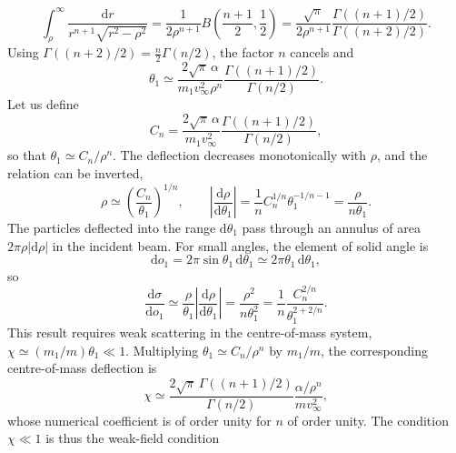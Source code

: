 \begin{problem}[title={Small-angle cross-section in a field \texorplain{$\alpha/r^n$}{α/rⁿ}}]
{\begin{equation*}
    \int_\rho^\infty \frac{\mathrm{d}r}{r^{n+1}\sqrt{r^2 - \rho^2}} = \frac{1}{2\rho^{n+1}}B\left( \frac{n+1}{2}, \frac{1}{2} \right) = \frac{\sqrt{\pi}}{2\rho^{n+1}}\frac{\Gamma\left( (n+1)/2 \right)}{\Gamma\left( (n+2)/2 \right)}.
\end{equation*}
Using $\Gamma\left( (n+2)/2 \right) = \frac{n}{2}\Gamma(n/2)$, the factor $n$ cancels and
\begin{equation*}
    \theta_1 \simeq \frac{2\sqrt{\pi}\,\alpha}{m_1v_\infty^2\rho^n}\frac{\Gamma\left( (n+1)/2 \right)}{\Gamma(n/2)}.
\end{equation*}
Let us define
\begin{equation*}
    C_n = \frac{2\sqrt{\pi}\,\alpha}{m_1v_\infty^2}\frac{\Gamma\left( (n+1)/2 \right)}{\Gamma(n/2)},
\end{equation*}
so that $\theta_1 \simeq C_n/\rho^n$. The deflection decreases monotonically with $\rho$, and the relation can be inverted,
\begin{equation*}
    \rho \simeq \left( \frac{C_n}{\theta_1} \right)^{1/n}, \qquad \left| \frac{\mathrm{d}\rho}{\mathrm{d}\theta_1} \right| = \frac{1}{n}C_n^{1/n}\theta_1^{-1/n-1} = \frac{\rho}{n\theta_1}.
\end{equation*}
The particles deflected into the range $\mathrm{d}\theta_1$ pass through an annulus of area $2\pi\rho|\mathrm{d}\rho|$ in the incident beam. For small angles, the element of solid angle is
\begin{equation*}
    \mathrm{d}o_1 = 2\pi\sin{\theta_1}\,\mathrm{d}\theta_1 \simeq 2\pi\theta_1\,\mathrm{d}\theta_1,
\end{equation*}
so
\begin{equation*}
    \frac{\mathrm{d}\sigma}{\mathrm{d}o_1} \simeq \frac{\rho}{\theta_1}\left| \frac{\mathrm{d}\rho}{\mathrm{d}\theta_1} \right| = \frac{\rho^2}{n\theta_1^2} = \frac{1}{n}\frac{C_n^{2/n}}{\theta_1^{2+2/n}}.
\end{equation*}
This result requires weak scattering in the centre-of-mass system, $\chi \simeq (m_1/m)\theta_1 \ll 1$. Multiplying $\theta_1 \simeq C_n/\rho^n$ by $m_1/m$, the corresponding centre-of-mass deflection is
\begin{equation*}
    \chi \simeq \frac{2\sqrt{\pi}\,\Gamma\left( (n+1)/2 \right)}{\Gamma(n/2)}\frac{\alpha/\rho^n}{mv_\infty^2},
\end{equation*}
whose numerical coefficient is of order unity for $n$ of order unity. The condition $\chi \ll 1$ is thus the weak-field condition
}
\end{problem}
